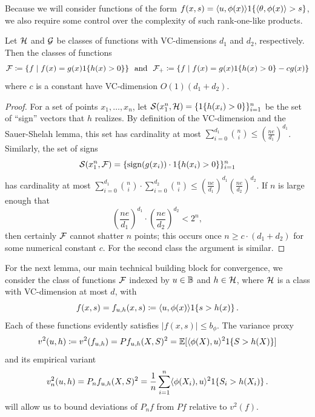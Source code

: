 \documentclass[11pt]{article}
\newcommand{\radphi}{b_{\phi}}
\newcommand{\scorefunc}{s}
\newcommand{\scoreval}{\scorefunc}
\newcommand{\scorerv}{S}
\begin{document}
Because we will consider functions of the form $f(x, \scoreval) = \<u,
\phi(x)\> \indic{\<\theta, \phi(x)\> > \scoreval}$, we also require
some control over the complexity of such rank-one-like products.
\begin{lemma}
  \label{lemma:product-vc}
  Let $\mathcal{H}$ and $\mathcal{G}$ be classes of functions with
  VC-dimensions $d_1$ and $d_2$, respectively. Then
  the classes of functions
  \begin{equation*}
    \mathcal{F} \coloneqq \{f \mid f(x) = g(x) 1\!\left\{h(x) > 0\right\}\}
    ~~ \mbox{and} ~~
    \mathcal{F}_+ \coloneqq \{f \mid f(x) = g(x) 1\!\left\{h(x) > 0\right\} - c g(x)\}
  \end{equation*}
  where $c$ is a constant
  have VC-dimension $O(1)(d_1 + d_2)$.
\end{lemma}
\begin{proof}
  For a set of points $x_1, \ldots, x_n$, let $\mathcal{S}(x_1^n, \mathcal{H}) =
  \{1\!\left\{h(x_i) > 0\right\}\}_{i = 1}^n$ be the set of ``sign'' vectors that $h$
  realizes.
  By definition of the VC-dimension and the Sauer-Shelah lemma, this set has
  cardinality at most $\sum_{i = 0}^{d_1} \binom{n}{i} \le
  (\frac{ne}{d_1})^{d_1}$.
  Similarly, the set of signs
  \begin{equation*}
    \mathcal{S}(x_1^n, \mathcal{F})
    = \{\mathop{\rm sign}(g(x_i)) \cdot 1\!\left\{h(x_i) > 0\right\}\}_{i = 1}^n
  \end{equation*}
  has cardinality at most $\sum_{i = 0}^{d_1} \binom{n}{i} \cdot \sum_{i =
    0}^{d_2} \binom{n}{i} \le (\frac{ne}{d_1})^{d_1}
  (\frac{ne}{d_2})^{d_2}$.
  If $n$ is large enough that
  \begin{equation*}
    \left(\frac{ne}{d_1}\right)^{d_1} \cdot \left(\frac{ne}{d_2}\right)^{d_2}
    < 2^n,
  \end{equation*}
  then certainly $\mathcal{F}$ cannot shatter $n$ points; this occurs
  once $n \ge c \cdot (d_1 + d_2)$ for some numerical constant $c$.
  For the second class the argument is similar.
\end{proof}

\newcommand{\rademacher}{\mathfrak{R}}

For the next lemma, our main technical building block for convergence, we
consider the class of functions $\mathcal{F}$ indexed by $u \in \mathbb{B}$ and $h \in
\mathcal{H}$, where $\mathcal{H}$ is a class with VC-dimension at most $d$,
with
\begin{equation}
  \label{eqn:product-function-class}
  f(x, \scoreval) = f_{u,h}(x, \scoreval)
  \defeq \<u, \phi(x)\> \indic{\scoreval > h(x)}.
\end{equation}
Each of these functions evidently satisfies
$|f(x, \scoreval)| \le \radphi$.
%
The variance proxy
\begin{equation}
  \label{eqn:variance-proxy}
  v^2(u, h) \defeq v^2(f_{u,h}) = P f_{u, h}(X, \scorerv)^2
  = \E[\<\phi(X), u\>^2 \indic{\scorerv > h(X)}]
\end{equation}
and its empirical variant
\begin{equation*}
  v_n^2(u, h) = P_n f_{u,h}(X, \scorerv)^2
  = \frac{1}{n} \sum_{i = 1}^n \<\phi(X_i), u\>^2 \indic{\scorerv_i > h(X_i)}.
\end{equation*}
will allow us to bound deviations of $P_n f$ from $P f$ relative
to $v^2(f)$.
\end{document}
